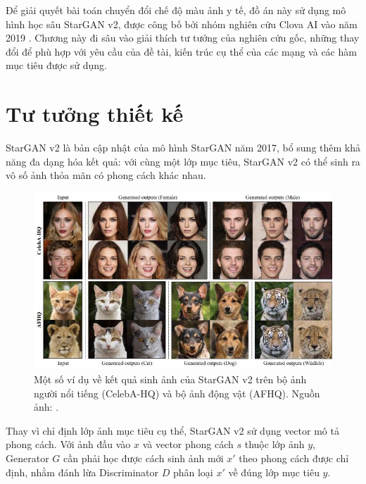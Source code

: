 \documentclass[12pt]{extreport}
\begin{document}
Để giải quyết bài toán chuyển đổi chế độ màu ảnh y tế, đồ án này sử dụng mô hình học sâu StarGAN v2, được công bố bởi nhóm nghiên cứu Clova AI vào năm 2019 \cite{DBLP:journals/corr/abs-1912-01865}. Chương này đi sâu vào giải thích tư tưởng của nghiên cứu gốc, những thay đổi để phù hợp với yêu cầu của đề tài, kiến trúc cụ thể của các mạng và các hàm mục tiêu được sử dụng.

\section{Tư tưởng thiết kế}

StarGAN v2 là bản cập nhật của mô hình StarGAN năm 2017, bổ sung thêm khả năng đa dạng hóa kết quả: với cùng một lớp mục tiêu, StarGAN v2 có thể sinh ra vô số ảnh thỏa mãn có phong cách khác nhau.

\begin{figure}[H]
    \centering
    \includegraphics[width=\linewidth]{figure22.jpg}
    \caption{Một số ví dụ về kết quả sinh ảnh của StarGAN v2 trên bộ ảnh người nổi tiếng (CelebA-HQ) và bộ ảnh động vật (AFHQ). Nguồn ảnh: \cite{DBLP:journals/corr/abs-1912-01865}.}
\end{figure}

Thay vì chỉ định lớp ảnh mục tiêu cụ thể, StarGAN v2 sử dụng vector mô tả phong cách. Với ảnh đầu vào $ x $ và vector phong cách $ s $ thuộc lớp ảnh $ y $, Generator $ G $ cần phải học được cách sinh ảnh mới $ x' $ theo phong cách được chỉ định, nhằm đánh lừa Discriminator $ D $ phân loại $ x' $ về đúng lớp mục tiêu $ y $.
\end{document}
